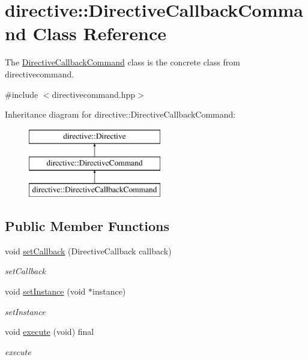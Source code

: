 \hypertarget{classdirective_1_1DirectiveCallbackCommand}{}\section{directive\+:\+:Directive\+Callback\+Command Class Reference}
\label{classdirective_1_1DirectiveCallbackCommand}


The \hyperlink{classdirective_1_1DirectiveCallbackCommand}{Directive\+Callback\+Command} class is the concrete class from directivecommand.  




{\ttfamily \#include $<$directivecommand.\+hpp$>$}

Inheritance diagram for directive\+:\+:Directive\+Callback\+Command\+:\begin{figure}[H]
\begin{center}
\leavevmode
\includegraphics[height=3.000000cm]{d0/d32/classdirective_1_1DirectiveCallbackCommand}
\end{center}
\end{figure}
\subsection*{Public Member Functions}
\begin{DoxyCompactItemize}
\item 
void \hyperlink{classdirective_1_1DirectiveCallbackCommand_a1a15a873c0213892ff78af2a91ed2f3d}{set\+Callback} (Directive\+Callback callback)
\begin{DoxyCompactList}\small\item\em set\+Callback \end{DoxyCompactList}\item 
void \hyperlink{classdirective_1_1DirectiveCallbackCommand_a272ae306407befe146d49198352b96bc}{set\+Instance} (void $\ast$instance)
\begin{DoxyCompactList}\small\item\em set\+Instance \end{DoxyCompactList}\item 
void \hyperlink{classdirective_1_1DirectiveCallbackCommand_a1a2503c60e82f8165bce617abab9e78c}{execute} (void) final
\begin{DoxyCompactList}\small\item\em execute \end{DoxyCompactList}\end{DoxyCompactItemize}
